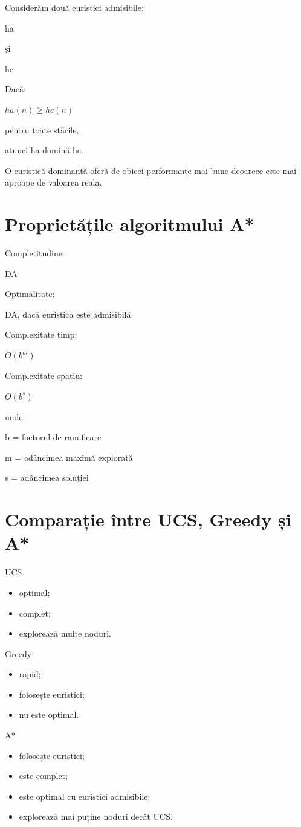 \documentclass[12pt,a4paper]{article}
\begin{document}
Considerăm două euristici admisibile:

ha

și

hc

Dacă:

$ha(n) \ge hc(n)$

pentru toate stările,

atunci ha domină hc.

O euristică dominantă oferă de obicei performanțe mai bune deoarece este mai aproape de valoarea reala.

\section{Proprietățile algoritmului A*}

Completitudine:

DA

Optimalitate:

DA, dacă euristica este admisibilă.

Complexitate timp:

$O(b^m)$

Complexitate spațiu:

$O(b^s)$

unde:

b = factorul de ramificare

m = adâncimea maximă explorată

s = adâncimea soluției

\section{Comparație între UCS, Greedy și A*}

UCS

\begin{itemize}
\item optimal;
\item complet;
\item explorează multe noduri.
\end{itemize}

Greedy

\begin{itemize}
\item rapid;
\item folosește euristici;
\item nu este optimal.
\end{itemize}

A*

\begin{itemize}
\item folosește euristici;
\item este complet;
\item este optimal cu euristici admisibile;
\item explorează mai puține noduri decât UCS.
\end{itemize}
\end{document}

